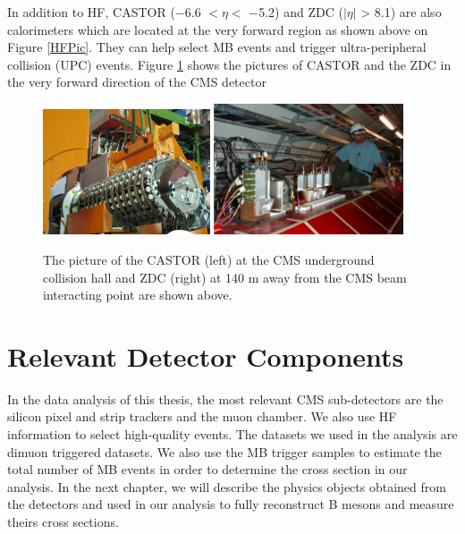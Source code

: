 In addition to HF, CASTOR ($-$6.6 $< \eta <$ $-$5.2) and ZDC ($|\eta|$ > 8.1) are also calorimeters which are located at the very forward region \cite{CASZDCRef} as shown above on Figure \ref{HFPic}. They can help select MB events and trigger ultra-peripheral collision (UPC) events. Figure \ref{CASTORZDC} shows the pictures of CASTOR and the ZDC in the very forward direction of the CMS detector

\begin{figure}[hbtp]
\begin{center}
\includegraphics[width=0.44\textwidth]{Figures/Chapter3/CASTOR.png}
\includegraphics[width=0.50\textwidth]{Figures/Chapter3/CMSZDC.png}
\caption{The picture of the CASTOR (left) at the CMS underground collision hall and ZDC (right) at 140 m away from the CMS beam interacting point are shown above.}
\label{CASTORZDC}
\end{center}
\end{figure} 


\section{Relevant Detector Components}

In the data analysis of this thesis, the most relevant CMS sub-detectors are the silicon pixel and strip trackers and the muon chamber. We also use HF information to select high-quality events. The datasets we used in the analysis are dimuon triggered datasets. We also use the MB trigger samples to estimate the total number of MB events in order to determine the cross section in our analysis. In the next chapter, we will describe the physics objects obtained from the detectors and used in our analysis to fully reconstruct B mesons and measure theirs cross sections.





